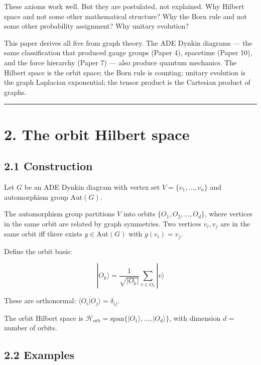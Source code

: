 \documentclass[11pt,a4paper]{article}
\begin{document}
These axioms work well. But they are postulated, not explained. Why Hilbert space and not some other mathematical structure? Why the Born rule and not some other probability assignment? Why unitary evolution?

This paper derives all five from graph theory. The ADE Dynkin diagrams — the same classification that produced gauge groups (Paper 4), spacetime (Paper 10), and the force hierarchy (Paper 7) — also produce quantum mechanics. The Hilbert space is the orbit space; the Born rule is counting; unitary evolution is the graph Laplacian exponential; the tensor product is the Cartesian product of graphs.

\begin{center}\rule{0.5\linewidth}{0.4pt}\end{center}

\section*{2. The orbit Hilbert space}

\subsection*{2.1 Construction}

Let $G$ be an ADE Dynkin diagram with vertex set $V = \{v_1, \ldots, v_n\}$ and automorphism group $\text{Aut}(G)$.

The automorphism group partitions $V$ into orbits $\{O_1, O_2, \ldots, O_d\}$, where vertices in the same orbit are related by graph symmetries. Two vertices $v_i, v_j$ are in the same orbit iff there exists $g \in \text{Aut}(G)$ with $g(v_i) = v_j$.

Define the orbit basis:

\[|O_k\rangle = \frac{1}{\sqrt{|O_k|}} \sum_{v \in O_k} |v\rangle\]

These are orthonormal: $\langle O_i | O_j \rangle = \delta_{ij}$.

The orbit Hilbert space is $\mathcal{H}_{\text{orb}} = \text{span}\{|O_1\rangle, \ldots, |O_d\rangle\}$, with dimension $d$ = number of orbits.

\subsection*{2.2 Examples}
\end{document}
